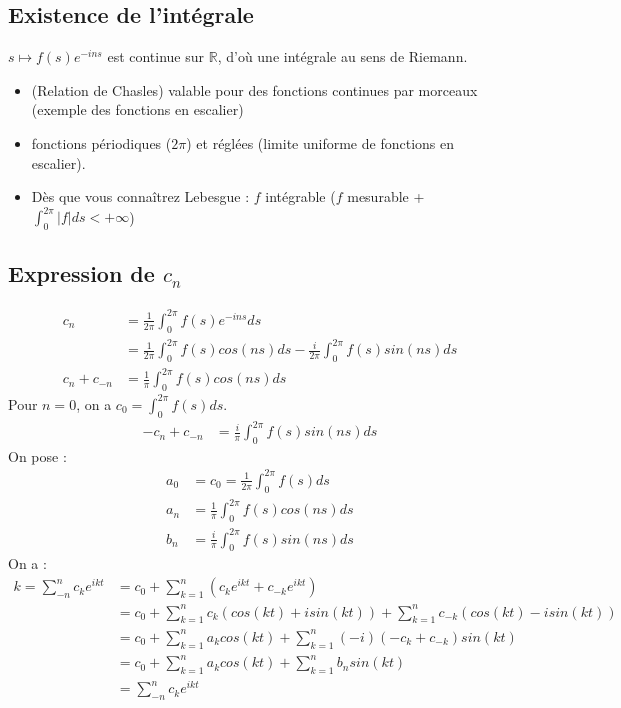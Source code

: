 \documentclass[a4paper, oneside]{report}
\theoremstyle{break}
\newcommand{\R}{\mathbb{R}}
\newcommand{\fracun}[1]{\frac{1}{#1}}
\begin{document}
\subsection{Existence de l'intégrale}
$s\mapsto f(s)e^{-ins}$ est continue sur $\R$, d'où une intégrale au sens de Riemann.\\
\begin{itemize}
\item (Relation de Chasles) valable pour des fonctions continues par morceaux (exemple des fonctions en escalier)
\item fonctions périodiques ($2\pi$) et réglées (limite uniforme de fonctions en escalier).
\item Dès que vous connaîtrez Lebesgue : $f$ intégrable ($f$ mesurable + $\int_0^{2\pi}|f|ds<+\infty$)
\end{itemize}

\subsection{Expression de $c_n$}
\begin{align*}
c_n&=\fracun{2\pi}\int_0^{2\pi}f(s)e^{-ins}ds\\
&=\fracun{2\pi} \int_0^{2\pi}f(s)cos(ns)ds-\frac{i}{2\pi} \int_0^{2\pi}f(s)sin(ns)ds\\
c_n+c_{-n}&=\fracun{\pi}\int_0^{2\pi}f(s)cos(ns)ds
\end{align*}
Pour $n=0$, on a $c_0=\int_0^{2\pi}f(s)ds$.\\
\begin{align*}
-c_n+c_{-n}&=\frac{i}{\pi}\int_0^{2\pi}f(s)sin(ns)ds
\end{align*}
On pose :
\begin{align*}
a_0&=c_0=\fracun{2\pi}\int_0^{2\pi}f(s)ds\\
a_n &=\fracun{\pi}\int_0^{2\pi}f(s)cos(ns)ds\\
b_n&=\frac{i}{\pi}\int_0^{2\pi}f(s)sin(ns)ds
\end{align*}
On a :
\begin{align*}
k=\sum_{-n}^{n}c_ke^{ikt}&=c_0+\sum_{k=1}^n(c_ke^{ikt}+c_{-k}e^{ikt})\\
&=c_0+\sum_{k=1}^nc_k(cos(kt)+i sin(kt))+\sum_{k=1}^nc_{-k}(cos(kt)-i sin(kt))\\
&=c_0+\sum_{k=1}^n a_kcos(kt)+ \sum_{k=1}^n(-i)(-c_k+c_{-k})sin(kt)\\
&=c_0+\sum_{k=1}^n a_kcos(kt)+ \sum_{k=1}^nb_nsin(kt)\\
&=\sum_{-n}^{n} c_ke^{ikt}
\end{align*}
\end{document}
